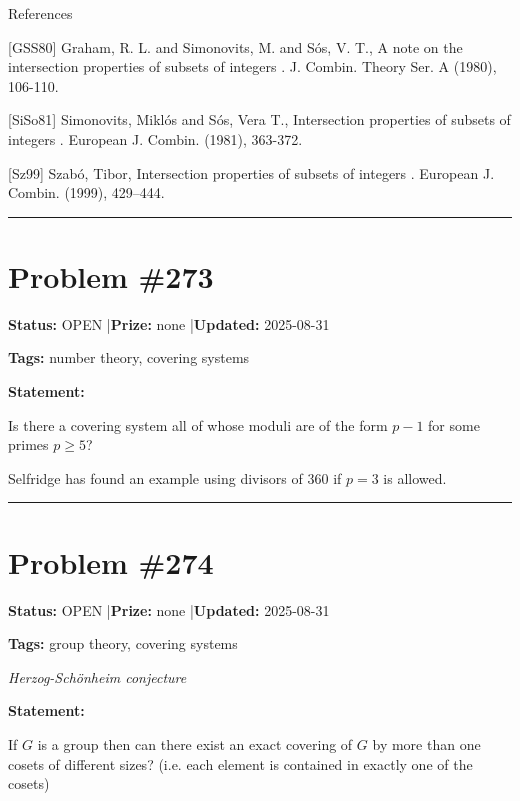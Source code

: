 \documentclass{article}
\begin{document}
References

[GSS80] Graham, R. L. and Simonovits, M. and S\'{o}s, V. T., A note on the intersection properties of subsets of integers . J. Combin. Theory Ser. A (1980), 106-110.

[SiSo81] Simonovits, Mikl\'{o}s and S\'{o}s, Vera T., Intersection properties of subsets of integers . European J. Combin. (1981), 363-372.

[Sz99] Szab\'o, Tibor, Intersection properties of subsets of integers . European J. Combin. (1999), 429--444.

\noindent\rule{\linewidth}{0.4pt}


\section{Problem \#273}
\label{prob:273}

\noindent\textbf{Status:} OPEN \quad|\quad \textbf{Prize:} none \quad|\quad \textbf{Updated:} 2025-08-31

\noindent\textbf{Tags:} number theory, covering systems

\medskip

\noindent\textbf{Statement:}

Is there a covering system all of whose moduli are of the form $p-1$ for some primes $p\geq 5$?




Selfridge has found an example using divisors of $360$ if $p=3$ is allowed.

\noindent\rule{\linewidth}{0.4pt}


\section{Problem \#274}
\label{prob:274}

\noindent\textbf{Status:} OPEN \quad|\quad \textbf{Prize:} none \quad|\quad \textbf{Updated:} 2025-08-31

\noindent\textbf{Tags:} group theory, covering systems

\medskip
\noindent\textit{Herzog-Schönheim conjecture}


\noindent\textbf{Statement:}

If $G$ is a group then can there exist an exact covering of $G$ by more than one cosets of different sizes? (i.e. each element is contained in exactly one of the cosets)
\end{document}
